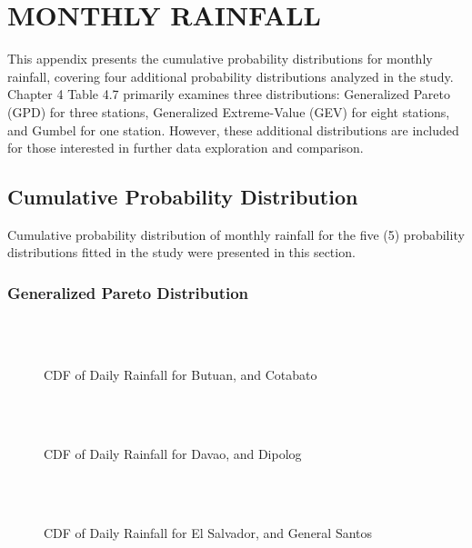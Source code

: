 \chapter{MONTHLY RAINFALL}
This appendix presents the cumulative probability distributions for monthly rainfall, covering four additional probability distributions analyzed in the study. Chapter 4 Table 4.7 primarily examines three distributions: Generalized Pareto (GPD) for three stations, Generalized Extreme-Value (GEV) for eight stations, and Gumbel for one station. However, these additional distributions are included for those interested in further data exploration and comparison.

\section{Cumulative Probability Distribution}
Cumulative probability distribution of monthly rainfall for the five (5) probability distributions fitted in the study were presented in this section.

\subsection{Generalized Pareto Distribution}

\begin{figure}[H]
  \centering
  \\
  \\
  \caption{CDF of Daily Rainfall for Butuan, and Cotabato}
  \label{fig:monthly_appendix_gpd_pt1}
\end{figure}

\begin{figure}[H]
  \centering
  \\
  \\
  \caption{CDF of Daily Rainfall for Davao, and Dipolog}
  \label{fig:monthly_appendix_gpd_pt2}
\end{figure}

\begin{figure}[H]
  \centering
  \\
  \\
  \caption{CDF of Daily Rainfall for El Salvador, and General Santos}
  \label{fig:monthly_appendix_gpd_pt3}
\end{figure}

